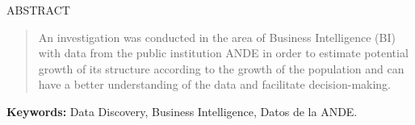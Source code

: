 \begin{center}
	ABSTRACT
\end{center}

\vspace*{2\baselineskip}
\begin{abstract}
	An investigation was conducted in the area of Business Intelligence (BI) with data from the public institution ANDE in order to estimate potential growth of its structure according to the growth of the population and can have a better understanding of the data and facilitate decision-making.
\end{abstract}

\vspace*{1\baselineskip}
\textbf{Keywords:} Data Discovery, Business Intelligence, Datos de la ANDE.